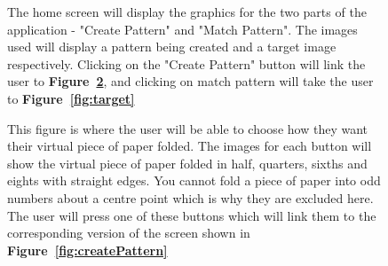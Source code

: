 \documentclass[11pt]{article}
\begin{document}
\begin{figure}
\begin{minipage}[c]{0.35\textwidth}
                \end{minipage}\hfill
                \begin{minipage}[c]{0.65\textwidth}
                \caption{The home screen will display the graphics for the two parts of the application - "Create Pattern" and "Match Pattern". The images used will display a pattern being created and a target image respectively. Clicking on the "Create Pattern" button will link the user to \textbf{Figure~\ref{fig:chooseFold}}, and clicking on match pattern will take the user to  \textbf{Figure~\ref{fig:target}}}
                \label{fig:homeScreen}
                \end{minipage}
            \end{figure}
            \begin{figure}
                \begin{minipage}[c]{0.65\textwidth}
                \caption{This figure is where the user will be able to choose how they want their virtual piece of paper folded. The images for each button will show the virtual piece of paper folded in half, quarters, sixths and eights with straight edges. You cannot fold a piece of paper into odd numbers about a centre point which is why they are excluded here. The user will press one of these buttons which will link them to the corresponding version of the screen shown in \textbf{Figure~\ref{fig:createPattern}}}
                \label{fig:chooseFold}
                \end{minipage}\hfill
                \begin{minipage}[c]{0.35\textwidth}

\end{minipage}
\end{figure}
\end{document}
